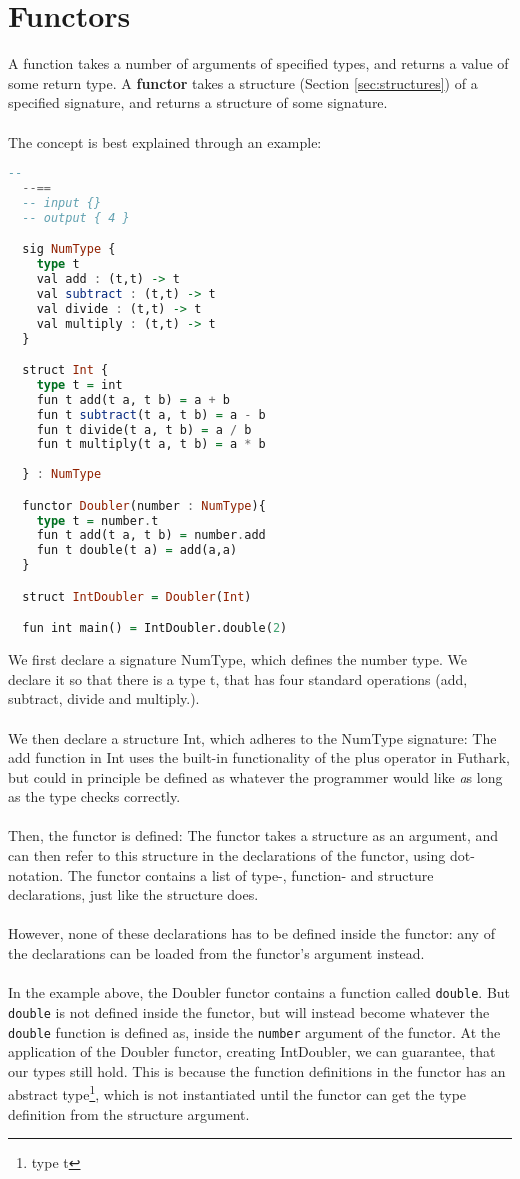 \section{Functors}
\label{sec:functors}
A function takes a number of arguments of specified types, and returns a value of some return type.
A \textbf{functor} takes a structure (Section \ref{sec:structures}) of a specified signature,
and returns a structure of some signature.
\\
\\
The concept is best explained through an example:
\begin{lstlisting}[language=Haskell]
  --
  --==
  -- input {}
  -- output { 4 }

  sig NumType {
    type t
    val add : (t,t) -> t
    val subtract : (t,t) -> t
    val divide : (t,t) -> t
    val multiply : (t,t) -> t
  }

  struct Int {
    type t = int
    fun t add(t a, t b) = a + b
    fun t subtract(t a, t b) = a - b
    fun t divide(t a, t b) = a / b
    fun t multiply(t a, t b) = a * b
    
  } : NumType

  functor Doubler(number : NumType){
    type t = number.t
    fun t add(t a, t b) = number.add
    fun t double(t a) = add(a,a) 
  }

  struct IntDoubler = Doubler(Int)

  fun int main() = IntDoubler.double(2)
\end{lstlisting}
We first declare a signature NumType, which defines the number type. We declare it so
that there is a type t, that has four standard operations (add, subtract, divide
and multiply.).
\\
\\
We then declare a structure Int, which adheres to the NumType signature:
The add function in Int uses the built-in functionality of the plus operator in
Futhark, but could in principle be defined as whatever the programmer would
like \emph as long as the type checks correctly.
\\
\\
Then, the functor is defined: The functor takes a structure as an argument, and
can then refer to this structure in the declarations of the functor, using
dot-notation.
The functor contains a list of type-, function- and structure declarations, just
like the structure does.
\\
\\
However, none of these declarations has to be defined inside the functor: any of the declarations can be loaded from the functor's argument instead.
\\
\\
In the example above, the Doubler functor contains a function called
\texttt{double}. But \texttt{double} is not defined inside the functor, but will
instead become whatever the \texttt{double} function is defined as, inside the \texttt{number}
argument of the functor.
At the application of the Doubler functor, creating IntDoubler, we can
guarantee, that our types still hold. This is because the function definitions
in the functor has an abstract type\footnote{type t}, which is not instantiated
until the functor can get the type definition from the structure argument.

